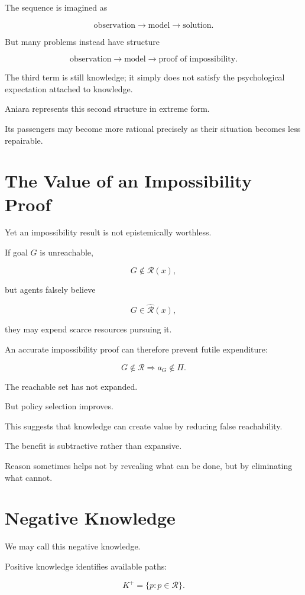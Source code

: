 \documentclass[11pt,oneside]{book}
\theoremstyle{definition}
\theoremstyle{remark}
\newcommand{\R}{\mathcal{R}}
\begin{document}
The sequence is imagined as

\[
\text{observation}
\rightarrow
\text{model}
\rightarrow
\text{solution}.
\]

But many problems instead have structure

\[
\text{observation}
\rightarrow
\text{model}
\rightarrow
\text{proof of impossibility}.
\]

The third term is still knowledge; it simply does not satisfy the psychological expectation attached to knowledge.

Aniara represents this second structure in extreme form.

Its passengers may become more rational precisely as their situation becomes less repairable.

\section{The Value of an Impossibility Proof}

Yet an impossibility result is not epistemically worthless.

If goal \(G\) is unreachable,

\[
G\notin\R(x),
\]

but agents falsely believe

\[
G\in\widehat{\R}(x),
\]

they may expend scarce resources pursuing it.

An accurate impossibility proof can therefore prevent futile expenditure:

\[
G\notin\R
\Rightarrow
a_G\notin\Pi.
\]

The reachable set has not expanded.

But policy selection improves.

This suggests that knowledge can create value by reducing false reachability.

The benefit is subtractive rather than expansive.

Reason sometimes helps not by revealing what can be done, but by eliminating what cannot.

\section{Negative Knowledge}

We may call this negative knowledge.

Positive knowledge identifies available paths:

\[
K^+
=
\{p:p\in\R\}.
\]
\end{document}
